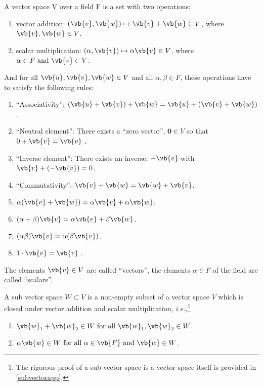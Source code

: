 \documentclass[a4paper,12pt]{report}
\begin{document}
\begin{definition}
A vector space V over a field F is a set with two operations:

\begin{enumerate}
    \item vector addition: \((\vb{v}, \vb{w}) \mapsto \vb{v} + \vb{w} \in V \), where \(\vb{v} , \vb{w} \in V\).
    \item scalar multiplication: \((\alpha ,\vb{v}) \mapsto \alpha \vb{v} \in V\), where \(\alpha \in F \text { and } \vb{v} \in V\). 
\end{enumerate}

And for all \(\vb{u} ,\vb{v} ,\vb{w} \in V\) and all \(\alpha ,\beta \in F\), these operations have to satisfy the following rules:

\begin{enumerate}[label=(\(A\)\arabic*)]\label{vectorspace} 
    \item ``Associativity'': \((\vb{u} + \vb{v} ) + \vb{w}  = \vb{u}  + (\vb{v} + \vb{w} )\) .
    \item ``Neutral element'': There exists a ``zero vector'', \(\boldsymbol{0} \in V\) so that \(0 + \vb{v} = \vb{v} \)  .
    \item ``Inverse element'': There exists an inverse, \(-\vb{v} \) with \(\vb{v} + (-\vb{v} ) = 0\).
    \item ``Commutativity'': \(\vb{v} + \vb{w} = \vb{w} + \vb{v} \).
    \item \(\alpha (\vb{v} +\vb{w} ) = \alpha \vb{v} + \alpha \vb{w} \).
    \item \((\alpha +\beta )\vb{v} = \alpha \vb{v} + \beta \vb{w} \).
    \item \((\alpha \beta )\vb{v} = \alpha (\beta \vb{v} )\).
    \item \(1\cdot \vb{v} = \vb{v} \)      .
\end{enumerate}

The elements \(\vb{v} \in V\) are called ``vectors'', the elements \(\alpha \in F\) of the field are called ``scalars''.  
\end{definition}

\begin{definition}\label{subvectorspace} 
A sub vector space \(W \subset V \) is a non-empty subset of a vector space \(V\) which is closed under vector addition and scalar multiplication, \textit{i.e.,}\footnote{The rigorous proof of a sub vector space is a vector space itself is provided in \cref{subvectorapp}.} 

\begin{enumerate}[label=(\(B\)\arabic*)]
    \item \(\vb{w} _{1} + \vb{w} _{2} \in W \text{ for all } \vb{w} _{1} , \vb{w} _{2} \in W\).
    \item \(\alpha \vb{w} \in W \text{ for all } \alpha \in \vb{F} \text { and } \vb{w} \in W\).     
\end{enumerate}
\end{definition}
\end{document}
